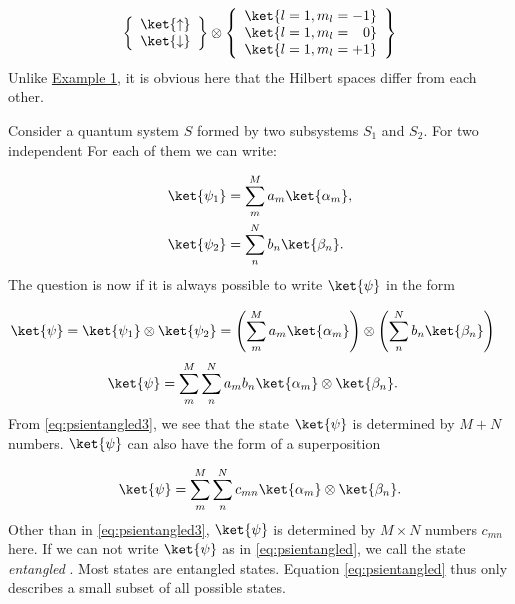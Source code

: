 \begin{align}
						\left\{

\begin{array}
{c} \ket{\uparrow} \\ \ket{\downarrow} \end{array}
 \right\} \otimes \left\{

\begin{array}
{c} \ket{l=1,m_l=-1} \\ \ket{l=1,m_l=\enspace \; 0} \\ \ket{l=1,m_l=+1}  \end{array}
 \right\}
					
\end{align}
Unlike \hyperref[sec:examplespin]{Example 1}, it is obvious here that the Hilbert spaces differ from each other. 
 
 
 
 
 
 
 
 Consider a quantum system $S$ formed by two subsystems $S_1$ and $S_2$. For two independent
 For each of them we can write:

\begin{align}
				\ket{\psi_1}&=\sum_m^M a_m \ket{\alpha_m},\\
				\ket{\psi_2}&=\sum_n^N b_n \ket{\beta_n}.
			
\end{align}
			The question is now if it is always possible to write $\ket{\psi}$ in the form

\begin{align}
 \label{eq:psientangled} 
	\ket{\psi}	&=\ket{\psi_1}\otimes\ket{\psi_2}=\left(\sum_m^M a_m \ket{\alpha_m}\right) \otimes \left(\sum_n^N b_n \ket{\beta_n}\right)
\end{align}
\begin{align}
\ket{\psi}	&=\sum_m^M \sum_n^N a_m b_n \ket{\alpha_m} \otimes \ket{\beta_n}. \label{eq:psientangled3} 
\end{align}
From \eqref{eq:psientangled3}, we see that the state $\ket{\psi}$ is determined by $M + N$ numbers. $\ket{\psi}$ can also have the form of a superposition

\begin{align}
\ket{\psi}=\sum_m^M \sum_n^N c_{mn}\ket{\alpha_m}\otimes \ket{\beta_n}.
\end{align}
Other than in \eqref{eq:psientangled3}, $\ket{\psi}$ is determined by $M \times N$ numbers $c_{mn}$ here. If we can not write $\ket{\psi}$ as in \eqref{eq:psientangled}, we call the state \emph{entangled} . Most states are entangled states. Equation \eqref{eq:psientangled} thus only describes a small subset of all possible states.



